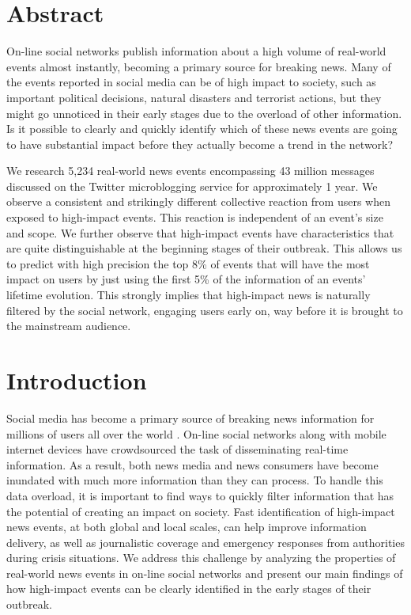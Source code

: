 \section*{Abstract}

On-line social networks publish information about a high volume of
real-world events almost instantly, becoming a primary source for
breaking news.  Many of the events reported in social media can be of
high impact to society, such as important political decisions, natural
disasters and terrorist actions, but they might go unnoticed in their
early stages due to the overload of other information.  Is it possible
to clearly and quickly identify which of these news events are going
to have substantial impact before they actually become a trend in the
network?

We research 5,234 real-world news events encompassing 43 million
messages discussed on the Twitter microblogging service for
approximately 1 year.
%
We observe a consistent and strikingly different collective reaction
from users when exposed to high-impact events.  This reaction is
independent of an event's size and scope.  We further observe that
high-impact events have characteristics that are quite distinguishable
at the beginning stages of their outbreak.  This allows us to predict
with high precision the top 8\% of events that will have the most
impact on users by just using the first 5\% of the information of an
events' lifetime evolution.  This strongly implies that high-impact
news is naturally filtered by the social network, engaging users early
on, way before it is brought to the mainstream audience.


\section*{Introduction}

Social media has become a primary source of breaking news information
for millions of users all over the world \cite{Kwak:2010}. On-line
social networks along with mobile internet devices have crowdsourced
the task of disseminating real-time information. As a result, both
news media and news consumers have become inundated with much more
information than they can process. To handle this data overload, it is
important to find ways to quickly filter information that has the
potential of creating an impact on society. Fast identification of
high-impact news events, at both global and local scales, can help
improve information delivery, as well as journalistic coverage and
emergency responses from authorities during crisis situations. We
address this challenge by analyzing the properties of real-world news
events in on-line social networks and present our main findings of how
high-impact events can be clearly identified in the early stages of
their outbreak.

